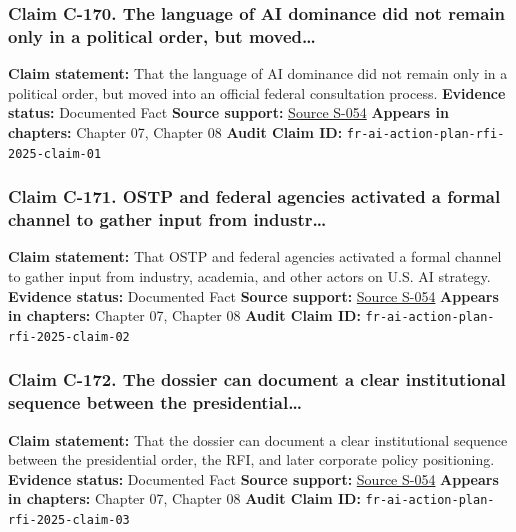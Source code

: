 \documentclass[
  american,
  11pt,
  letterpaper,
]{article}
\begin{document}
\subsubsection{Claim C-170. The language of AI dominance did not remain
only in a political order, but
moved\ldots{}}\label{claim-c-170-the-language-of-ai-dominance-did-not-remain-only-in-a-political-order-but-moved}

\textbf{Claim statement:} That the language of AI dominance did not
remain only in a political order, but moved into an official federal
consultation process. \textbf{Evidence status:} Documented Fact
\textbf{Source support:}
\hyperref[source-s-054-request-for-information-on-the-development-of-an-artificial-intelligence-ai-action-plan]{Source
S-054} \textbf{Appears in chapters:} Chapter 07, Chapter 08
\textbf{Audit Claim ID:} \texttt{fr-ai-action-plan-rfi-2025-claim-01}

\subsubsection{Claim C-171. OSTP and federal agencies activated a formal
channel to gather input from
industr\ldots{}}\label{claim-c-171-ostp-and-federal-agencies-activated-a-formal-channel-to-gather-input-from-industr}

\textbf{Claim statement:} That OSTP and federal agencies activated a
formal channel to gather input from industry, academia, and other actors
on U.S. AI strategy. \textbf{Evidence status:} Documented Fact
\textbf{Source support:}
\hyperref[source-s-054-request-for-information-on-the-development-of-an-artificial-intelligence-ai-action-plan]{Source
S-054} \textbf{Appears in chapters:} Chapter 07, Chapter 08
\textbf{Audit Claim ID:} \texttt{fr-ai-action-plan-rfi-2025-claim-02}

\subsubsection{Claim C-172. The dossier can document a clear
institutional sequence between the
presidential\ldots{}}\label{claim-c-172-the-dossier-can-document-a-clear-institutional-sequence-between-the-presidential}

\textbf{Claim statement:} That the dossier can document a clear
institutional sequence between the presidential order, the RFI, and
later corporate policy positioning. \textbf{Evidence status:} Documented
Fact \textbf{Source support:}
\hyperref[source-s-054-request-for-information-on-the-development-of-an-artificial-intelligence-ai-action-plan]{Source
S-054} \textbf{Appears in chapters:} Chapter 07, Chapter 08
\textbf{Audit Claim ID:} \texttt{fr-ai-action-plan-rfi-2025-claim-03}
\end{document}
